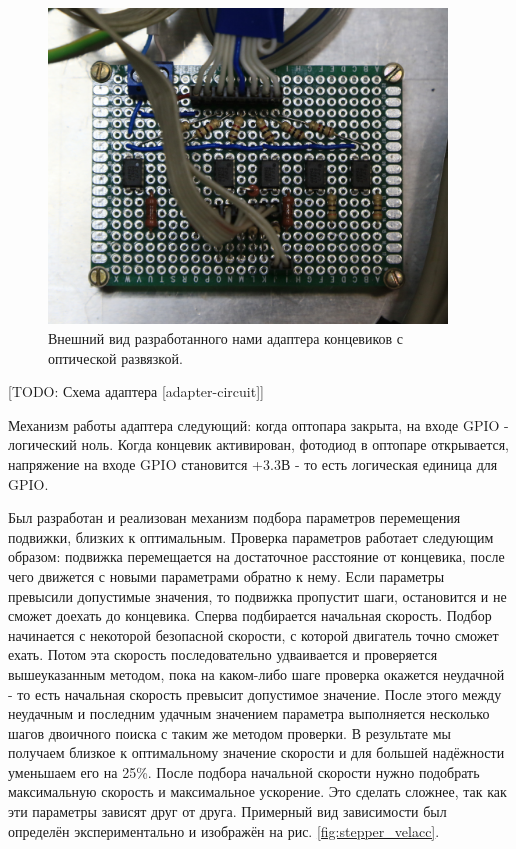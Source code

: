 \documentclass[14pt,russian,a4paper]{extarticle}
\newcounter{subsubsubsection}[subsubsection]
\begin{document}
\begin{figure}[h!]
    \centerline{\includegraphics[width=300pt]{media/adapter.jpg}}
    \caption{Внешний вид разработанного нами адаптера концевиков с оптической развязкой.}
    \label{fig:adapter}
\end{figure}

[TODO: Схема адаптера [adapter-circuit]]

Механизм работы адаптера следующий: когда оптопара закрыта, на входе GPIO - логический ноль. Когда концевик активирован, фотодиод в оптопаре открывается, напряжение на входе GPIO становится +3.3В - то есть логическая единица для GPIO.

Был разработан и реализован механизм подбора параметров перемещения подвижки, близких к оптимальным. Проверка параметров работает следующим образом: подвижка перемещается на достаточное расстояние от концевика, после чего движется с новыми параметрами обратно к нему. Если параметры превысили допустимые значения, то подвижка пропустит шаги, остановится и не сможет доехать до концевика. Сперва подбирается начальная скорость. Подбор начинается с некоторой безопасной скорости, с которой двигатель точно сможет ехать. Потом эта скорость последовательно удваивается и проверяется вышеуказанным методом, пока на каком-либо шаге проверка окажется неудачной - то есть начальная скорость превысит допустимое значение. После этого между неудачным и последним удачным значением параметра выполняется несколько шагов двоичного поиска с таким же методом проверки. В результате мы получаем близкое к оптимальному значение скорости и для большей надёжности уменьшаем его на 25\%. После подбора начальной скорости нужно подобрать максимальную скорость и максимальное ускорение. Это сделать сложнее, так как эти параметры зависят друг от друга. Примерный вид зависимости был определён экспериментально и изображён на рис. \ref{fig:stepper_velacc}.
\newline
\end{document}
